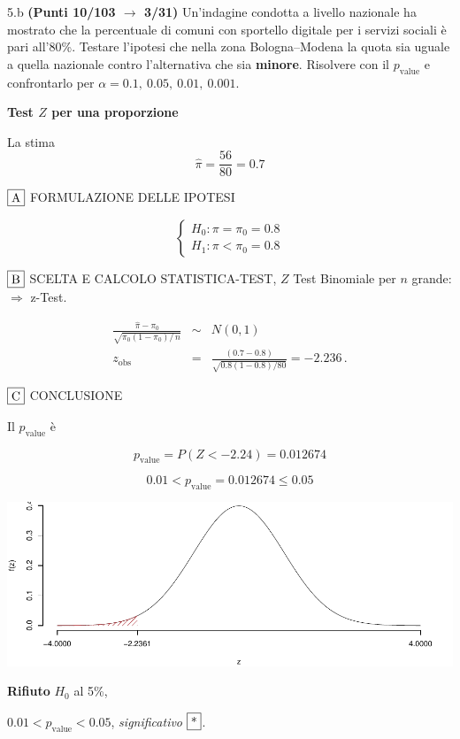 \documentclass[
  11pt,
]{book}
\theoremstyle{mytheoremstyle}
\theoremstyle{mydefstyle}
\newenvironment{sol}
  {
  \begin{tcolorbox}[enhanced,breakable,arc=0.1mm,boxrule=1pt,colback=white,colframe=iblue,
  title=\bf \fontfamily{lmss}\selectfont \hspace{.5 cm} Soluzione,drop fuzzy shadow]

}{
\end{tcolorbox}
  }
\begin{document}
5.b \textbf{(Punti 10/103 \(\rightarrow\) 3/31)} Un'indagine condotta a livello nazionale ha mostrato che la percentuale di comuni con sportello digitale per i servizi sociali è pari all'80\%. Testare l'ipotesi che nella zona Bologna--Modena la quota sia uguale a quella nazionale contro l'alternativa che sia \textbf{minore}. Risolvere con il \(p_\text{value}\) e confrontarlo per \(\alpha = 0.1,\ 0.05,\ 0.01,\ 0.001\).

\begin{sol}
\textbf{Test \(Z\) per una proporzione}

La stima
\[\hat\pi=\frac { 56 } { 80 }= 0.7  \]

\(\fbox{A}\) FORMULAZIONE DELLE IPOTESI

\[\begin{cases}
   H_0: \pi = \pi_0=0.8 \\
   H_1: \pi < \pi_0=0.8 
   \end{cases}\]

\(\fbox{B}\) SCELTA E CALCOLO STATISTICA-TEST, \(Z\)
Test Binomiale per \(n\) grande: \(\Rightarrow\) z-Test.

\begin{eqnarray*}
   \frac{\hat\pi - \pi_{0}} {\sqrt {\pi_0(1-\pi_0)/\,n}}&\sim&N(0,1)\\
   z_{\text{obs}}
   &=& \frac{ ( 0.7 -  0.8 )} {\sqrt{ 0.8 (1- 0.8 )/ 80 }}
   =   -2.236 \,.
   \end{eqnarray*}

\(\fbox{C}\) CONCLUSIONE

Il \(p_{\text{value}}\) è

\[ p_{\text{value}} = P(Z<-2.24)=0.012674 \]

\[
 0.01 < p_\text{value}= 0.012674 \leq 0.05 
\]

\begin{center}\includegraphics{Esami_passati_con_soluzioni_files/figure-latex/unnamed-chunk-43-1} \end{center}

\textbf{Rifiuto} \(H_0\) al 5\%,

\(0.01<p_\text{value}<0.05\), \emph{significativo} \(\fbox{*}\).

\end{sol}
\end{document}
